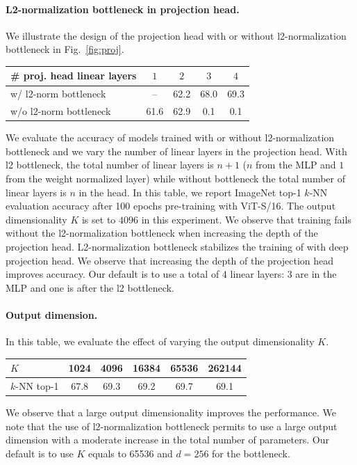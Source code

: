\paragraph{L2-normalization bottleneck in projection head.}
We illustrate the design of the projection head with or without l2-normalization bottleneck in Fig.~\ref{fig:proj}.
\begin{table}[h!]
\vspace{-0.8em}
  \centering
  \begin{tabular}{@{}l c c c c@{}}
	  \# proj. head linear layers & $1$ & $2$ & $3$ & $4$\\
    \midrule
	  w/ l2-norm bottleneck & -- & 62.2 & 68.0 & \colorbox{Light}{69.3} \\
	  w/o l2-norm bottleneck & 61.6 & 62.9 & 0.1 & 0.1 \\
  \end{tabular}
\vspace{-0.8em}
\end{table}
We evaluate the accuracy of \OURS models trained with or without l2-normalization bottleneck and we vary the number of linear layers in the projection head.
With l2 bottleneck, the total number of linear layers is $n + 1$ ($n$ from the MLP and $1$ from the weight normalized layer) while without bottleneck the total number of linear layers is $n$ in the head.
In this table, we report ImageNet top-1 $k$-NN evaluation accuracy after 100 epochs pre-training with ViT-S/16.
The output dimensionality $K$ is set to $4096$ in this experiment.
We observe that \OURS training fails without the l2-normalization bottleneck when increasing the depth of the projection head.
L2-normalization bottleneck stabilizes the training of \OURS with deep projection head.
We observe that increasing the depth of the projection head improves accuracy.
Our default is to use a total of 4 linear layers: 3 are in the MLP and one is after the l2 bottleneck.

\paragraph{Output dimension.}
In this table, we evaluate the effect of varying the output dimensionality $K$.
\begin{table}[h!]
\vspace{-0.8em}
  \centering
  \begin{tabular}{@{}l c c c c c@{}}
	  $K$ & 1024 & 4096 & 16384 & 65536 & 262144 \\
    \midrule
	  $k$-NN top-1 & 67.8 & 69.3 & 69.2 & \colorbox{Light}{69.7} & 69.1 \\
  \end{tabular}
\vspace{-0.8em}
\end{table}
We observe that a large output dimensionality improves the performance.
We note that the use of l2-normalization bottleneck permits to use a large output dimension with a moderate increase in the total number of parameters.
Our default is to use $K$ equals to 65536 and $d=256$ for the bottleneck.

